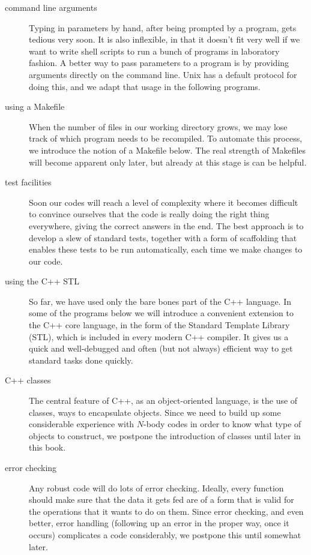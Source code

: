 \begin{description}
\item[command line arguments]
Typing in parameters by hand, after being prompted by a program,
gets tedious very soon.  It is also inflexible, in that it doesn't fit
very well if we want to write shell scripts to run a bunch of programs
in laboratory fashion.  A better way to pass parameters to a program
is by providing arguments directly on the command line.  Unix has a
default protocol for doing this, and we adapt that usage in the
following programs.

\item[using a Makefile]
When the number of files in our working directory grows, we may lose
track of which program needs to be recompiled.  To automate this
process, we introduce the notion of a Makefile below.  The real
strength of Makefiles will become apparent only later, but already at
this stage is can be helpful.

\item[test facilities]
Soon our codes will reach a level of complexity where it becomes
difficult to convince ourselves that the code is really doing the
right thing everywhere, giving the correct answers in the end.
The best approach is to develop a slew of standard tests, together
with a form of scaffolding that enables these tests to be run
automatically, each time we make changes to our code.

\item[using the C++ STL]
So far, we have used only the bare bones part of the C++ language.  In
some of the programs below we will introduce a convenient extension to
the C++ core language, in the form of the Standard Template Library
(STL), which is included in every modern C++ compiler.  It gives us a
quick and well-debugged and often (but not always) efficient way to
get standard tasks done quickly.

\item[C++ classes]
The central feature of C++, as an object-oriented language, is the use
of classes, ways to encapsulate objects.  Since we need to build up
some considerable experience with $N$-body codes in order to know what
type of objects to construct, we postpone the introduction of classes
until later in this book.

\item[error checking]
Any robust code will do lots of error checking.  Ideally, every
function should make sure that the data it gets fed are of a form that
is valid for the operations that it wants to do on them.  Since error
checking, and even better, error handling (following up an error in
the proper way, once it occurs) complicates a code considerably, we
postpone this until somewhat later.


\end{description}
